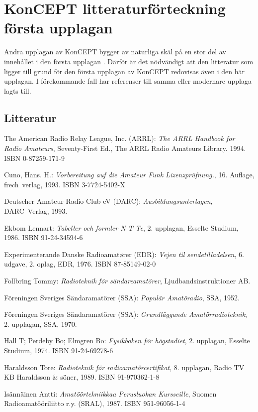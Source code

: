 \chapter{KonCEPT litteraturförteckning första upplagan}
\label{konceptlitteratur}

Andra upplagan av KonCEPT bygger av naturliga skäl på en stor del av innehållet
i den första upplagan \cite{KonCEPT1}.
Därför är det nödvändigt att den litteratur som ligger till grund för den första
upplagan av KonCEPT redovisas även i den här upplagan.
I förekommande fall har referenser till samma eller modernare upplaga lagts
till.

\section{Litteratur}

The American Radio Relay League, Inc. (ARRL):
\emph{The ARRL Handbook for Radio Amateurs}, Seventy-First Ed.,
The ARRL Radio Amateurs Library. 1994. ISBN 0-87259-171-9 \cite{ARRLHDB2015}

Cuno, Hans. H.: \emph{Vorbereitung auf die Amateur Funk Lizenzpr\"ufnung.},
16. Auflage, frech~verlag, 1993. ISBN 3-7724-5402-X

Deutscher Amateur Radio Club eV (DARC): \emph{Ausbildungsunterlagen},
DARC~Verlag, 1993. \cite{DARCaus}

Ekbom Lennart: \emph{Tabeller och formler N T Te}, 2. upplagan, Esselte Studium,
1986. ISBN 91-24-34594-6

Experimenterande Danske Radioamat\o rer (EDR):
\emph{Vejen til sendetilladelsen}, 6. udgave, 2. oplag, EDR, 1976.
ISBN 87-85149-02-0

Follbring Tommy: \emph{Radioteknik för sändareamatörer},
Ljudbandsinstruktioner AB.

Föreningen Sveriges Sändaramatörer (SSA): \emph{Populär Amatöradio}, SSA, 1952.

Föreningen Sveriges Sändaramatörer (SSA):
\emph{Grundläggande Amatörradioteknik}, 2. upplagan, SSA, 1970.

Hall T; Perdeby Bo; Elmgren Bo: \emph{Fysikboken för högstadiet}, 2. upplagan,
Esselte Studium, 1974. ISBN 91-24-69278-6

Haraldsson Tore: \emph{Radioteknik för radioamatörcertifikat}, 8. upplagan,
Radio TV KB Haraldsson \& söner, 1989. ISBN 91-970362-1-8

Isännäinen Antti: \emph{Amatöörtekniikkaa Perusluokan Kursseille}, Suomen
Radioamatööriliitto r.y. (SRAL), 1987. ISBN 951-96056-1-4

